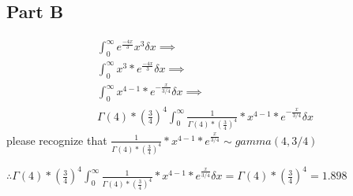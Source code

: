 \documentclass{article}\usepackage[]{graphicx}\usepackage[]{color}
\begin{document}
\subsection*{Part B}
\begin{equation}
\begin{split}
\int_{0}^{\infty}e^{\frac{-4x}{3}}x^3\delta x \implies \\
\int_{0}^{\infty}x^3*e^{\frac{-4x}{3}}\delta x \implies \\
\int_{0}^{\infty}x^{4-1}*e^{-\frac{x}{3/4}}\delta x \implies \\
\Gamma(4)*(\frac{3}{4})^4\int_{0}^{\infty}\frac{1}{\Gamma(4)*(\frac{3}{4})^4}*x^{4-1}*e^{-\frac{x}{3/4}}\delta x
\end{split}
\end{equation}
please recognize that $\frac{1}{\Gamma(4)*(\frac{3}{4})^4}*x^{4-1}*e^{\frac{x}{3/4}}\sim gamma(4,3/4)$

$\therefore \Gamma(4)*(\frac{3}{4})^4\int_{0}^{\infty}\frac{1}{\Gamma(4)*(\frac{3}{4})^4}*x^{4-1}*e^{\frac{x}{3/4}}\delta x = \Gamma(4)*(\frac{3}{4})^4 = 1.898$
\end{document}
